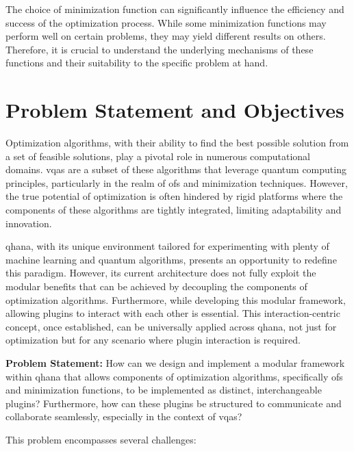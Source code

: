\documentclass[
  a4paper,  %
  twoside,  %
  bibliography=totoc,
  headsepline,
  cleardoublepage=empty,
  parskip=half,
  draft=false
]{scrbook}
\begin{document}
The choice of minimization function can significantly influence the efficiency and success of the optimization process.
While some minimization functions may perform well on certain problems, they may yield different results on others.
Therefore, it is crucial to understand the underlying mechanisms of these functions and their suitability to the specific problem at hand.


\chapter{Problem Statement and Objectives}
\label{chap:problem}

Optimization algorithms, with their ability to find the best possible solution from a set of feasible solutions, play a pivotal role in numerous computational domains.
\glspl{vqa} are a subset of these algorithms that leverage quantum computing principles, particularly in the realm of \glspl{of} and minimization techniques.
However, the true potential of optimization is often hindered by rigid platforms where the components of these algorithms are tightly integrated, limiting adaptability and innovation.

\gls{qhana}, with its unique environment tailored for experimenting with plenty of machine learning and quantum algorithms, presents an opportunity to redefine this paradigm.
However, its current architecture does not fully exploit the modular benefits that can be achieved by decoupling the components of optimization algorithms.
Furthermore, while developing this modular framework, allowing plugins to interact with each other is essential.
This interaction-centric concept, once established, can be universally applied across \gls{qhana}, not just for optimization but for any scenario where plugin interaction is required.

\textbf{Problem Statement:}
How can we design and implement a modular framework within \gls{qhana} that allows components of optimization algorithms, specifically \glspl{of} and minimization functions, to be implemented as distinct, interchangeable plugins?
Furthermore, how can these plugins be structured to communicate and collaborate seamlessly, especially in the context of \glspl{vqa}?

This problem encompasses several challenges:
\end{document}
